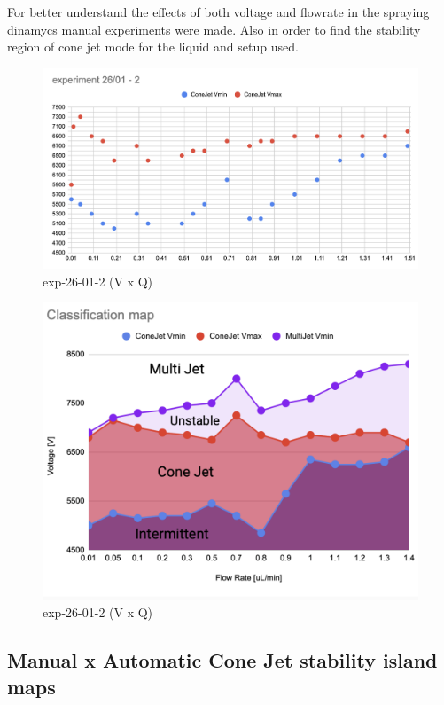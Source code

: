     For better understand the effects of both voltage and flowrate in the spraying dinamycs manual experiments were made.
    Also in order to find the stability region of cone jet mode for the liquid and setup used.



    \begin{figure}[H]
        \center
        \includegraphics[width=12cm]{Figuras/report3/exp26-01-2.png}
        \caption{ exp-26-01-2 (V x Q)}
    \end{figure}


    \begin{figure}[H]
        \center
        \includegraphics[width=12cm]{Figuras/regions.png}
        \caption{ exp-26-01-2 (V x Q)}
    \end{figure}



    \subsection{Manual x Automatic Cone Jet stability island maps}

